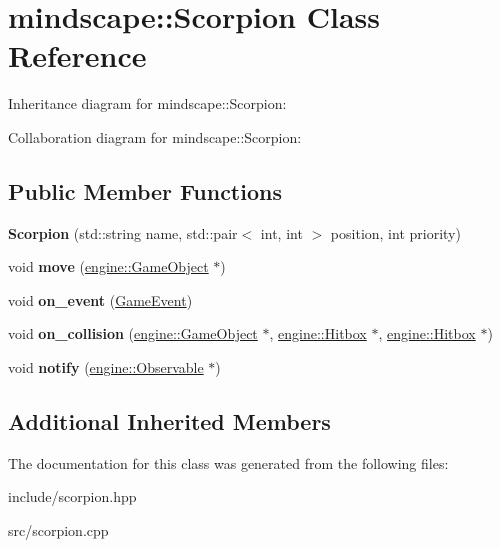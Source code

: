 \hypertarget{classmindscape_1_1_scorpion}{}\section{mindscape\+:\+:Scorpion Class Reference}
\label{classmindscape_1_1_scorpion}


Inheritance diagram for mindscape\+:\+:Scorpion\+:


Collaboration diagram for mindscape\+:\+:Scorpion\+:
\subsection*{Public Member Functions}
\begin{DoxyCompactItemize}
\item 
{\bfseries Scorpion} (std\+::string name, std\+::pair$<$ int, int $>$ position, int priority)\hypertarget{classmindscape_1_1_scorpion_a4177d8e6e1dc80f806d081341cfdfbf9}{}\label{classmindscape_1_1_scorpion_a4177d8e6e1dc80f806d081341cfdfbf9}

\item 
void {\bfseries move} (\hyperlink{classengine_1_1_game_object}{engine\+::\+Game\+Object} $\ast$)\hypertarget{classmindscape_1_1_scorpion_af5dc16c6dce9db3cc266a9ba59b4c0a9}{}\label{classmindscape_1_1_scorpion_af5dc16c6dce9db3cc266a9ba59b4c0a9}

\item 
void {\bfseries on\+\_\+event} (\hyperlink{class_game_event}{Game\+Event})\hypertarget{classmindscape_1_1_scorpion_a5e0aa8fda5f9e6264beb428368077da9}{}\label{classmindscape_1_1_scorpion_a5e0aa8fda5f9e6264beb428368077da9}

\item 
void {\bfseries on\+\_\+collision} (\hyperlink{classengine_1_1_game_object}{engine\+::\+Game\+Object} $\ast$, \hyperlink{classengine_1_1_hitbox}{engine\+::\+Hitbox} $\ast$, \hyperlink{classengine_1_1_hitbox}{engine\+::\+Hitbox} $\ast$)\hypertarget{classmindscape_1_1_scorpion_ab1b64d05f6f0280830132ddf46d13242}{}\label{classmindscape_1_1_scorpion_ab1b64d05f6f0280830132ddf46d13242}

\item 
void {\bfseries notify} (\hyperlink{classengine_1_1_observable}{engine\+::\+Observable} $\ast$)\hypertarget{classmindscape_1_1_scorpion_aaa94c9c620ff2fe58e8315ac1112aeb5}{}\label{classmindscape_1_1_scorpion_aaa94c9c620ff2fe58e8315ac1112aeb5}

\end{DoxyCompactItemize}
\subsection*{Additional Inherited Members}


The documentation for this class was generated from the following files\+:\begin{DoxyCompactItemize}
\item 
include/scorpion.\+hpp\item 
src/scorpion.\+cpp\end{DoxyCompactItemize}
